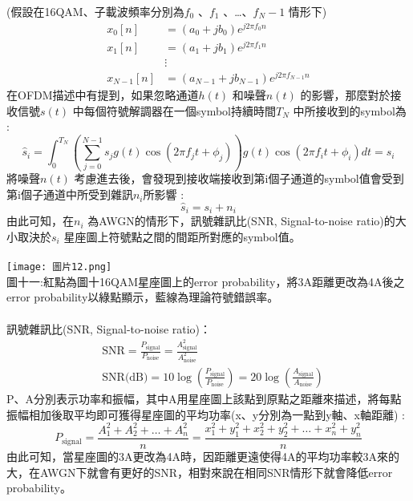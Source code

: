 \documentclass[12pt,a4paper]{article} %
\begin{document}
(假設在16QAM、子載波頻率分別為$f_0$ 、$f_1$ 、…、$f_N-1$ 情形下)
\begin{align*}
x_0[n] &= (a_0 + jb_0) e^{j2\pi f_0 n} \\
x_1[n] &= (a_1 + jb_1) e^{j2\pi f_1 n} \\
&\vdots \\
x_{N-1}[n] &= (a_{N-1} + jb_{N-1}) e^{j2\pi f_{N-1} n}
\end{align*}
在OFDM描述中有提到，如果忽略通道$h(t)$ 和噪聲$n(t)$ 的影響，那麼對於接收信號$s(t)$ 中每個符號解調器在一個symbol持續時間$T_N$ 中所接收到的symbol為 :\\
\[\hat{s}_i = \int_{0}^{T_N} \left( \sum_{j=0}^{N-1} s_j g(t) \cos(2\pi f_j t + \phi_j) \right) g(t) \cos(2\pi f_i t + \phi_i) dt = s_i\]
將噪聲$n(t)$ 考慮進去後，會發現到接收端接收到第i個子通道的symbol值會受到第i個子通道中所受到雜訊$n_i$所影響 :
\[\hat{s}_i = s_i + n_i\]
由此可知，在$n_i$ 為AWGN的情形下，訊號雜訊比(SNR, Signal-to-noise ratio)\cite{ziemer2006principles}的大小取決於$s_i$ 星座圖上符號點之間的間距所對應的symbol值。\\
\\
\texttt{[image: 圖片12.png]}\\
圖十一:紅點為圖十16QAM星座圖上的error probability，將3A距離更改為4A後之error probability以綠點顯示，藍線為理論符號錯誤率。\\
\\
訊號雜訊比(SNR, Signal-to-noise ratio)：\\
\begin{align*}
& \text{SNR} = \frac{P_{\text{signal}}}{P_{\text{noise}}} = \frac{A_{\text{signal}}^2}{A_{\text{noise}}^2}\\
& \text{SNR(dB)} = 10\log\left(\frac{P_{\text{signal}}}{P_{\text{noise}}}\right) = 20\log\left(\frac{A_{\text{signal}}}{A_{\text{noise}}}\right)
\end{align*}
P、A分別表示功率和振幅，其中A用星座圖上該點到原點之距離來描述，將每點振幅相加後取平均即可獲得星座圖的平均功率(x、y分別為一點到y軸、x軸距離) :\\
\[P_{\text{signal}} = \frac{A_1^2 + A_2^2 + \dots + A_n^2}{n} 
= \frac{x_1^2 + y_1^2 + x_2^2 + y_2^2 + \dots + x_n^2 + y_n^2}{n}\]
由此可知，當星座圖的3A更改為4A時，因距離更遠使得4A的平均功率較3A來的大，在AWGN下就會有更好的SNR，相對來說在相同SNR情形下就會降低error probability。
\newpage
\end{document}
